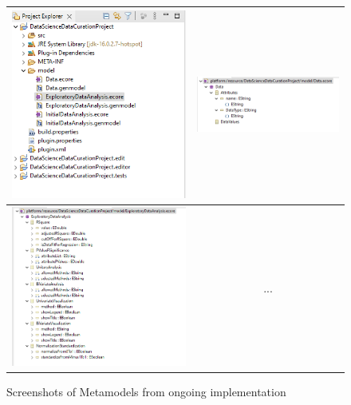 \begin{figure}[!htb]
\begin{tabular}{|c|c|}
\hline
 \includegraphics[scale=0.5]{images/code/models-and-code.png} & \includegraphics[scale=0.5]{images/code/data-ecore-model.png} \\
\hline
\includegraphics[scale=0.5]{images/code/eda-ecore-model.png} & ...\\
\hline
\end{tabular}
\caption{Screenshots of Metamodels from ongoing implementation}
\label{metamodelcode}
\end{figure}



